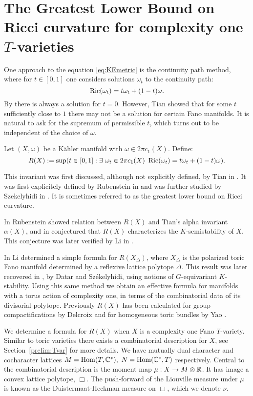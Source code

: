 \chapter{The Greatest Lower Bound on Ricci curvature for complexity one $T$-varieties} \label{chap:R(X)}
One approach to the equation \ref{eq:KEmetric} is the continuity path method, where for \(t \in [0,1]\) one considers solutions \(\omega_t\) to the continuity path:
\[
\mathop{\rm Ric}\nolimits(\omega_t) = t\omega_t + (1-t) \omega.
\]
By \cite{Yau1977} there is always a solution for \(t = 0\). However, Tian \cite{tian1992stability} showed that for some \(t\) sufficiently close to \(1\) there may not be a solution for certain Fano manifolds. It is natural to ask for the supremum of permissible \(t\), which turns out to be independent of the choice of \(\omega\).
\begin{definition}
Let \((X,\omega)\) be a K\"ahler manifold with \(\omega \in 2 \pi c_1(X)\). Define:
\[
R(X) := \sup ( t \in [0,1]   : \exists \ \omega_t \in 2 \pi c_1(X)  \ \mathop{\rm Ric}\nolimits( \omega_t) = t \omega_t + (1-t) \omega ).
\]
\end{definition}
This invariant was first discussed, although not explicitly defined, by Tian in \cite{Tian87}. It was first explicitely defined by Rubenstein in \cite{rubinstein2008} and was further studied by Szekelyhidi in \cite{szekelyhidi2011}. It is sometimes referred to as the greatest lower bound on Ricci curvature.

In \cite{rubinstein2008} Rubenstein showed relation between \(R(X)\) and Tian's alpha invariant \(\alpha(X)\), and in \cite{rubinstein2009} conjectured that \(R(X)\) characterizes the \(K\)-semistability of \(X\). This conjecture was later verified by Li in \cite{li2017}.

In \cite{li2011} Li  determined a simple formula for \(R(X_\Delta)\), where \(X_\Delta\) is the polarized toric Fano manifold determined by a reflexive lattice polytope \(\Delta\). This result was later recovered in \cite{datar2016kahler}, by Datar and Sz\'ekelyhidi, using notions of \(G\)-equivariant \(K\)-stability. Using this same method we obtain an effective formula for manifolds with a torus action of complexity one, in terms of the combinatorial data of its divisorial polytope. Previously \(R(X)\) has been calculated for group compactifications by Delcroix \cite{delcroix2017} and for homogeneous toric bundles by Yao \cite{yao2017}.

We determine a formula for \(R(X)\) when \(X\) is a complexity one Fano \(T\)-variety. Similar to toric varieties there exists a combinatorial description for \(X\), see Section~\ref{prelim:Tvar} for more details. We have mutually dual character and cocharacter lattices \(M = \operatorname{Hom}(T,\mathbb{C}^*), \ N = \operatorname{Hom}(\mathbb{C}^*,T)\) respectively. Central to the combinatorial description is the moment map \(\mu: X \to M \otimes \mathbb{R} \). It has image a convex lattice polytope, \(\Box\). The push-forward of the Liouville measure under \(\mu\) is known as the Duistermaat-Heckman measure on \(\Box\), which we denote \(\nu\).

